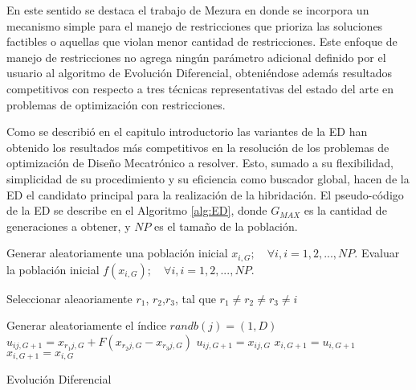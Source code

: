 En este sentido se destaca el trabajo de Mezura en \cite{mezura2004simple} donde se incorpora un mecanismo simple para el manejo de restricciones que prioriza las soluciones factibles o aquellas que violan menor cantidad de restricciones. Este enfoque de manejo de restricciones no agrega ningún parámetro adicional definido por el usuario al algoritmo de Evolución Diferencial, obteniéndose además resultados competitivos con respecto a tres técnicas representativas del estado del arte en problemas de optimización con restricciones.

Como se describió en el capitulo introductorio las variantes de la ED han obtenido los resultados más competitivos en la resolución de los problemas de optimización de Diseño Mecatrónico a resolver. Esto, sumado a su flexibilidad, simplicidad de su procedimiento y su eficiencia como buscador global, hacen de la ED el candidato principal para la realización de la hibridación. El pseudo-código de la ED se describe en el Algoritmo \ref{alg:ED}, donde $G_{MAX}$ es la cantidad de generaciones a obtener, y $NP$ es el tamaño de la población.
\begin{algorithm}
	\begin{algorithmic}[1]
		\STATE Generar aleatoriamente una población inicial $x_{i,G}; \quad \forall i,i = 1, 2, ..., NP$. 
        \STATE Evaluar la población inicial $f(x_{i,G}); \quad  \forall i,i = 1, 2, ..., NP$. 

             \STATE Seleccionar aleaoriamente $r_1$, $r_2$,$r_3$, tal que $ r_1 \neq r_2 \neq r_3  \neq i$
             
             \STATE Generar aleatoriamente el índice $randb(j)=(1,D)$ 
              	\STATE $u_{ij,G+1} = x_{r_1j,G} + F (x_{r_2 j ,G}-x_{r_3 j,G})$
              	\ELSE 
                  \STATE $u_{ij,G+1} = x_{ij,G}$
                \ENDIF
              \ENDFOR
                  \STATE $x_{i,G+1} = u_{i,G+1}$
                  \ELSE
                 \STATE $x_{i,G+1} = x_{i,G}$
               \ENDIF
           \ENDFOR
          \ENDFOR
        
	\end{algorithmic}
	\caption{Evolución Diferencial}\label{alg:ED}
\end{algorithm}


